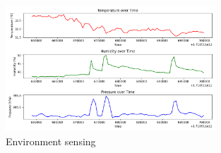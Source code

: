 \documentclass{article}
\begin{document}
    \begin{figure}
            \centering
            \includegraphics[width=0.7\textwidth]{scripts/environment1.png}
            \caption{Environment sensing}
            \label{fig:environment1}
        \end{figure}
\end{document}
